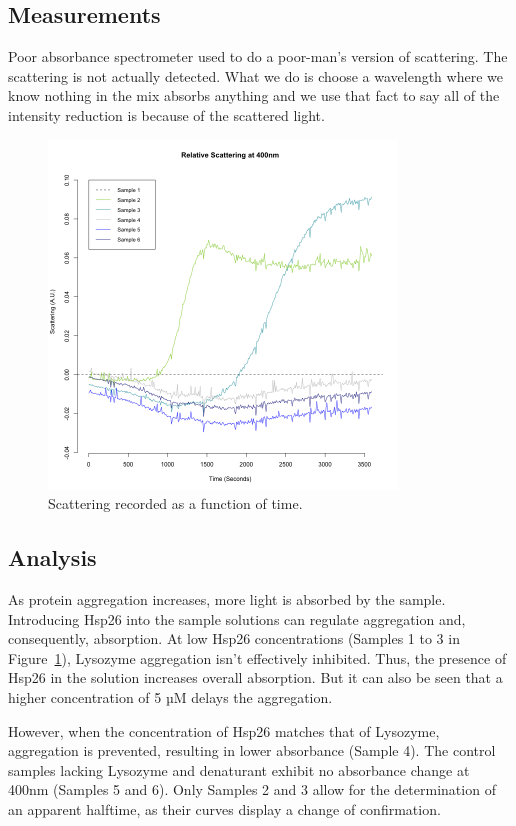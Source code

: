 \documentclass[a4paper,11pt]{article}
\begin{document}
        \subsection*{Measurements}
            Poor absorbance spectrometer used to do a poor-man's version of scattering. The scattering is not actually detected.
            What we do is choose a wavelength where we know nothing in the mix absorbs anything and we use that fact to say all of the intensity reduction is 
            because of the scattered light.
            \begin{figure}[H]
                \centering
                \includegraphics[width=350px]{../resources/aggregation_main.png}
                \caption{Scattering recorded as a function of time.}\label{fig:agg_main}
            \end{figure}

        \subsection*{Analysis}
            As protein aggregation increases, more light is absorbed by the sample. 
            Introducing Hsp26 into the sample solutions can regulate aggregation and, consequently, 
            absorption. At low Hsp26 concentrations (Samples 1 to 3 in Figure~\ref{fig:agg_main}), Lysozyme aggregation 
            isn't effectively inhibited. Thus, the presence of Hsp26 in the solution increases overall 
            absorption. But it can also be seen that a higher concentration of 5 µM delays the aggregation. 
            
            However, when the concentration of Hsp26 matches that of Lysozyme, aggregation is prevented, 
            resulting in lower absorbance (Sample 4). 
            The control samples lacking Lysozyme and denaturant exhibit no absorbance change at 400nm (Samples 5 and 6). 
            Only Samples 2 and 3 allow for the determination of an apparent halftime, as their curves 
            display a change of confirmation.
    \pagebreak
    
\end{document}
